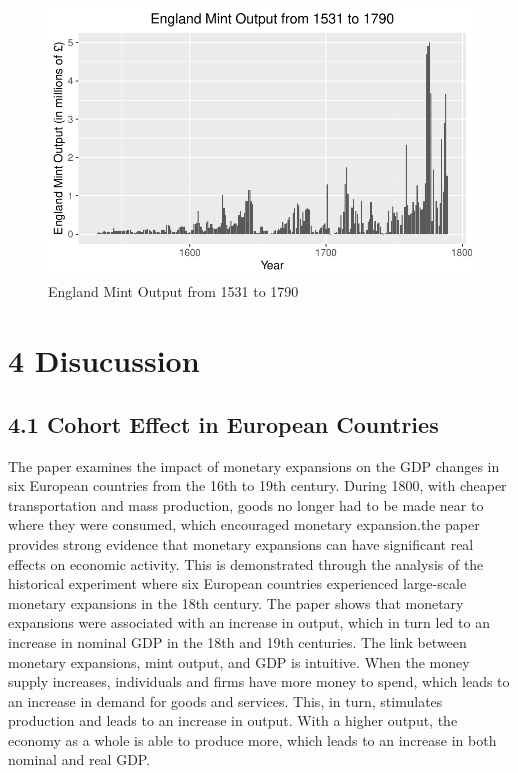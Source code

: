 \documentclass[
  letterpaper,
  DIV=11,
  numbers=noendperiod]{scrartcl}
\begin{document}
\begin{figure}

{\centering \includegraphics{paper_files/figure-pdf/fig-mintoutput-1.pdf}

}

\caption{\label{fig-mintoutput}England Mint Output from 1531 to 1790}

\end{figure}

\hypertarget{disucussion}{%
\section{4 Disucussion}\label{disucussion}}

\hypertarget{cohort-effect-in-european-countries}{%
\subsection{4.1 Cohort Effect in European
Countries}\label{cohort-effect-in-european-countries}}

The paper examines the impact of monetary expansions on the GDP changes
in six European countries from the 16th to 19th century. During 1800,
with cheaper transportation and mass production, goods no longer had to
be made near to where they were consumed, which encouraged monetary
expansion.the paper provides strong evidence that monetary expansions
can have significant real effects on economic activity. This is
demonstrated through the analysis of the historical experiment where six
European countries experienced large-scale monetary expansions in the
18th century. The paper shows that monetary expansions were associated
with an increase in output, which in turn led to an increase in nominal
GDP in the 18th and 19th centuries. The link between monetary
expansions, mint output, and GDP is intuitive. When the money supply
increases, individuals and firms have more money to spend, which leads
to an increase in demand for goods and services. This, in turn,
stimulates production and leads to an increase in output. With a higher
output, the economy as a whole is able to produce more, which leads to
an increase in both nominal and real GDP.
\end{document}
